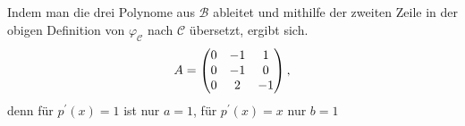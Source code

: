 \documentclass{../mfa}
\begin{document}
\subsection{}
Indem man die drei Polynome aus $\mathcal{B}$ ableitet und mithilfe der zweiten
Zeile in der obigen Definition von $\varphi_\mathcal{C}$ nach $\mathcal{C}$
übersetzt, ergibt sich.
\begin{equation*}
   A = \begin{pmatrix}0 & -1 & 1 \\ 0 & -1 & 0 \\ 0 & 2 & -1\end{pmatrix},
\end{equation*}
denn für $p^\prime(x) = 1$ ist nur $a=1$, für $p^\prime(x) = x$ nur $b=1$
\end{document}
